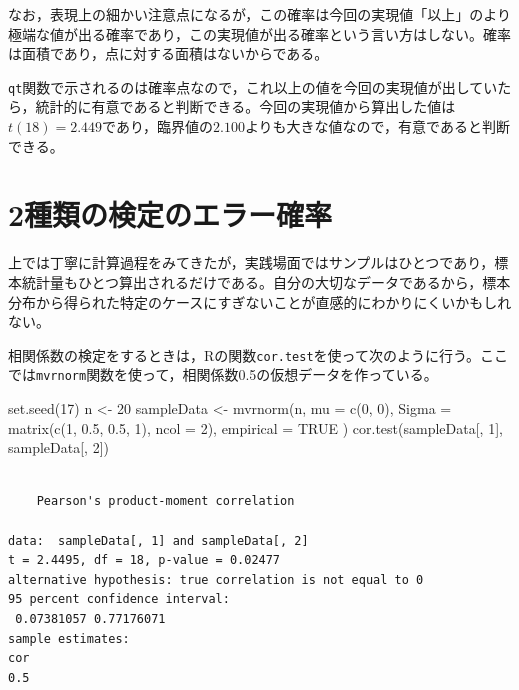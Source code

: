 \documentclass[
  a4paper,
]{ltjsbook}
\newenvironment{Shaded}{\begin{snugshade}}{\end{snugshade}}
\newcommand{\AttributeTok}[1]{\textcolor[rgb]{0.40,0.45,0.13}{#1}}
\newcommand{\ConstantTok}[1]{\textcolor[rgb]{0.56,0.35,0.01}{#1}}
\newcommand{\DecValTok}[1]{\textcolor[rgb]{0.68,0.00,0.00}{#1}}
\newcommand{\FloatTok}[1]{\textcolor[rgb]{0.68,0.00,0.00}{#1}}
\newcommand{\FunctionTok}[1]{\textcolor[rgb]{0.28,0.35,0.67}{#1}}
\newcommand{\NormalTok}[1]{\textcolor[rgb]{0.00,0.23,0.31}{#1}}
\newcommand{\OtherTok}[1]{\textcolor[rgb]{0.00,0.23,0.31}{#1}}
\begin{document}
なお，表現上の細かい注意点になるが，この確率は今回の実現値「以上」のより極端な値が出る確率であり，この実現値が出る確率という言い方はしない。確率は面積であり，点に対する面積はないからである。

\texttt{qt}関数で示されるのは確率点なので，これ以上の値を今回の実現値が出していたら，統計的に有意であると判断できる。今回の実現値から算出した値は\(t(18)=2.449\)であり，臨界値の\(2.100\)よりも大きな値なので，有意であると判断できる。

\section{2種類の検定のエラー確率}\label{ux7a2eux985eux306eux691cux5b9aux306eux30a8ux30e9ux30fcux78baux7387}

上では丁寧に計算過程をみてきたが，実践場面ではサンプルはひとつであり，標本統計量もひとつ算出されるだけである。自分の大切なデータであるから，標本分布から得られた特定のケースにすぎないことが直感的にわかりにくいかもしれない。

相関係数の検定をするときは，Rの関数\texttt{cor.test}を使って次のように行う。ここでは\texttt{mvrnorm}関数を使って，相関係数0.5の仮想データを作っている。

\begin{Shaded}
\begin{Highlighting}[]
\FunctionTok{set.seed}\NormalTok{(}\DecValTok{17}\NormalTok{)}
\NormalTok{n }\OtherTok{\textless{}{-}} \DecValTok{20}
\NormalTok{sampleData }\OtherTok{\textless{}{-}} \FunctionTok{mvrnorm}\NormalTok{(n,}
  \AttributeTok{mu =} \FunctionTok{c}\NormalTok{(}\DecValTok{0}\NormalTok{, }\DecValTok{0}\NormalTok{),}
  \AttributeTok{Sigma =} \FunctionTok{matrix}\NormalTok{(}\FunctionTok{c}\NormalTok{(}\DecValTok{1}\NormalTok{, }\FloatTok{0.5}\NormalTok{, }\FloatTok{0.5}\NormalTok{, }\DecValTok{1}\NormalTok{), }\AttributeTok{ncol =} \DecValTok{2}\NormalTok{),}
  \AttributeTok{empirical =} \ConstantTok{TRUE}
\NormalTok{)}
\FunctionTok{cor.test}\NormalTok{(sampleData[, }\DecValTok{1}\NormalTok{], sampleData[, }\DecValTok{2}\NormalTok{])}
\end{Highlighting}
\end{Shaded}

\begin{verbatim}

    Pearson's product-moment correlation

data:  sampleData[, 1] and sampleData[, 2]
t = 2.4495, df = 18, p-value = 0.02477
alternative hypothesis: true correlation is not equal to 0
95 percent confidence interval:
 0.07381057 0.77176071
sample estimates:
cor 
0.5 
\end{verbatim}
\end{document}
